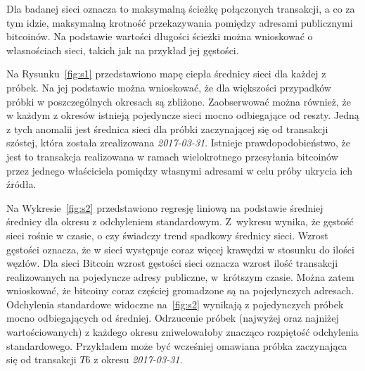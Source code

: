 \documentclass[12pt, oneside, final, openany]{mgr}
\begin{document}
\indent Dla badanej sieci oznacza to maksymalną ścieżkę połączonych transakcji, a co za tym idzie, maksymalną krotność przekazywania pomiędzy adresami publicznymi bitcoinów. Na podstawie wartości długości ścieżki można wnioskować o własnościach sieci, takich jak na przykład jej gęstości.

\indent Na Rysunku~\ref{fig:s1} przedstawiono mapę ciepła średnicy sieci dla każdej z próbek. Na jej podstawie można wnioskować, że dla większości przypadków próbki w poszczególnych okresach są zbliżone. Zaobserwować można również, że w każdym z okresów istnieją pojedyncze sieci mocno odbiegające od reszty. Jedną z tych anomalii jest średnica sieci dla próbki zaczynającej się od transakcji szóstej, która została zrealizowana \textit{2017-03-31}. Istnieje prawdopodobieństwo, że jest to transakcja realizowana w ramach wielokrotnego przesyłania bitcoinów przez jednego właściciela pomiędzy własnymi adresami w celu próby ukrycia ich źródła.

\indent Na Wykresie~\ref{fig:s2} przedstawiono regresję liniową na podstawie średniej średnicy dla okresu z odchyleniem standardowym. Z~wykresu wynika, że gęstość sieci rośnie w czasie, o czy świadczy trend spadkowy średnicy sieci. Wzrost gęstości oznacza, że w sieci występuje coraz więcej krawędzi w stosunku do ilości węzłów. Dla sieci Bitcoin wzrost gęstości sieci oznacza wzrost ilość transakcji realizowanych na pojedyncze adresy publiczne, w~krótszym czasie. Można zatem wnioskować, że bitcoiny coraz częściej gromadzone są na pojedynczych adresach. Odchylenia standardowe widoczne na~\ref{fig:s2} wynikają z pojedynczych próbek mocno odbiegających od średniej. Odrzucenie próbek (najwyżej oraz najniżej wartościowanych) z każdego okresu zniwelowałoby znacząco rozpiętość odchylenia standardowego. Przykładem może być wcześniej omawiana próbka zaczynająca się od transakcji $T6$ z okresu \textit{2017-03-31}. 
\end{document}
